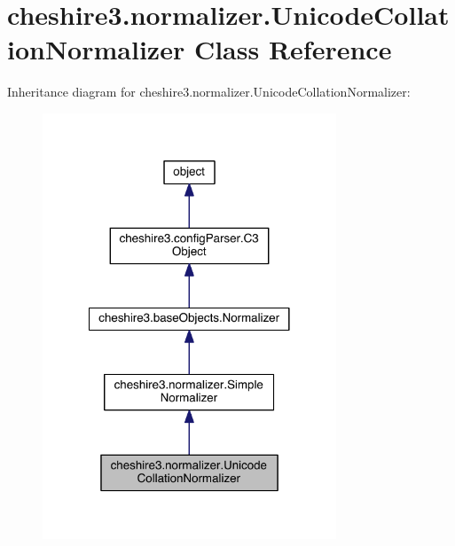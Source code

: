 \hypertarget{classcheshire3_1_1normalizer_1_1_unicode_collation_normalizer}{\section{cheshire3.\-normalizer.\-Unicode\-Collation\-Normalizer Class Reference}
\label{classcheshire3_1_1normalizer_1_1_unicode_collation_normalizer}
}


Inheritance diagram for cheshire3.\-normalizer.\-Unicode\-Collation\-Normalizer\-:
\nopagebreak
\begin{figure}[H]
\begin{center}
\leavevmode
\includegraphics[width=248pt]{classcheshire3_1_1normalizer_1_1_unicode_collation_normalizer__inherit__graph}
\end{center}
\end{figure}



